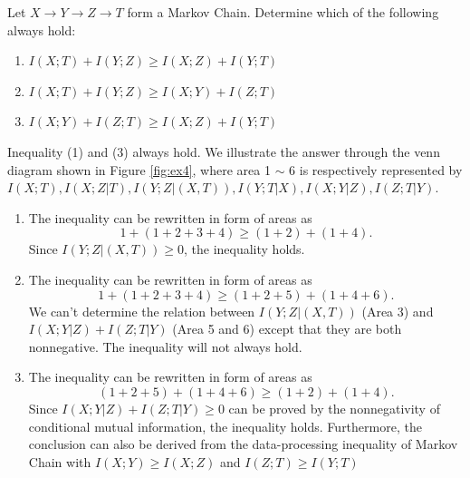 \begin{exercise}[]{Let $X \rightarrow Y \rightarrow Z \rightarrow T$ form a Markov Chain. Determine which of the following always hold:
  \begin{enumerate}
    \item $I(X;T)+I(Y;Z) \ge I(X;Z)+I(Y;T)$
    \item $I(X;T)+I(Y;Z) \ge I(X;Y)+I(Z;T)$
    \item $I(X;Y)+I(Z;T) \ge I(X;Z)+I(Y;T)$
  \end{enumerate}
}
  \begin{solution}
    Inequality (1) and (3) always hold. We illustrate the answer through the venn diagram shown in Figure \ref{fig:ex4}, where area 1 $\sim$ 6 is respectively represented by $I(X;T),I(X;Z|T),I(Y;Z|(X,T)),I(Y;T|X),I(X;Y|Z),I(Z;T|Y)$.
    \begin{enumerate}
      \item {
        The inequality can be rewritten in form of areas as
        $$1+(1+2+3+4)\ge (1+2)+(1+4).$$
        Since $I(Y;Z|(X,T))\ge 0$, the inequality holds.
      }
      \item {
        The inequality can be rewritten in form of areas as
        $$1+(1+2+3+4)\ge (1+2+5)+(1+4+6).$$
        We can't determine the relation between $I(Y;Z|(X,T))$ (Area 3) and $I(X;Y|Z)+I(Z;T|Y)$ (Area 5 and 6) except that they are both nonnegative. The inequality will not always hold.
      }
      \item {
        The inequality can be rewritten in form of areas as
        $$(1+2+5)+(1+4+6)\ge (1+2)+(1+4).$$
        Since $I(X;Y|Z)+I(Z;T|Y) \ge 0$ can be proved by the nonnegativity of conditional mutual information, the inequality holds.
        Furthermore, the conclusion can also be derived from the data-processing inequality of Markov Chain with $I(X;Y)\ge I(X;Z)$ and $I(Z;T)\ge I(Y;T)$
      }
    \end{enumerate}
  \end{solution}
\end{exercise}



